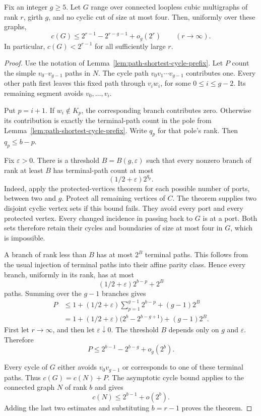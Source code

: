 \begin{theorem}
\label{thm:path-fixed-girth-deficit}
Fix an integer $g\ge5$.
Let $G$ range over connected loopless cubic multigraphs of rank $r$, girth $g$, and no cyclic cut of size at most four.
Then, uniformly over these graphs,
\[
 c(G)\le 2^{r-1}-2^{r-g-1}+o_g(2^r)
 \qquad(r\to\infty).
\]
In particular, $c(G)<2^{r-1}$ for all sufficiently large $r$.
\end{theorem}

\begin{proof}
Use the notation of Lemma~\ref{lem:path-shortest-cycle-prefix}.
Let $P$ count the simple $v_0$--$v_{g-1}$ paths in $N$.
The cycle path $v_0v_1\cdots v_{g-1}$ contributes one.
Every other path first leaves this fixed path through $v_iw_i$, for some $0\le i\le g-2$.
Its remaining segment avoids $v_0,\ldots,v_i$.

Put $p=i+1$.
If $w_i\notin K_p$, the corresponding branch contributes zero.
Otherwise its contribution is exactly the terminal-path count in the pole from Lemma~\ref{lem:path-shortest-cycle-prefix}.
Write $q_p$ for that pole's rank.
Then $q_p\le b-p$.

Fix $\varepsilon>0$.
There is a threshold $B=B(g,\varepsilon)$ such that every nonzero branch of rank at least $B$ has terminal-path count at most
\[
 (1/2+\varepsilon)2^{q_p}.
\]
Indeed, apply the protected-vertices theorem for each possible number of ports, between two and $g$.
Protect all remaining vertices of $C$.
The theorem supplies two disjoint cyclic vertex sets if this bound fails.
They avoid every port and every protected vertex.
Every changed incidence in passing back to $G$ is at a port.
Both sets therefore retain their cycles and boundaries of size at most four in $G$, which is impossible.

A branch of rank less than $B$ has at most $2^B$ terminal paths.
This follows from the usual injection of terminal paths into their affine parity class.
Hence every branch, uniformly in its rank, has at most
\[
 (1/2+\varepsilon)2^{b-p}+2^B
\]
paths.
Summing over the $g-1$ branches gives
\begin{align*}
 P
 &\le 1+(1/2+\varepsilon)\sum_{p=1}^{g-1}2^{b-p}+(g-1)2^B\\
 &=1+(1/2+\varepsilon)\bigl(2^b-2^{b-g+1}\bigr)+(g-1)2^B.
\end{align*}
First let $r\to\infty$, and then let $\varepsilon\downarrow0$.
The threshold $B$ depends only on $g$ and $\varepsilon$.
Therefore
\[
 P\le 2^{b-1}-2^{b-g}+o_g(2^b).
\]

Every cycle of $G$ either avoids $v_0v_{g-1}$ or corresponds to one of these terminal paths.
Thus $c(G)=c(N)+P$.
The asymptotic cycle bound applies to the connected graph $N$ of rank $b$ and gives
\[
 c(N)\le2^{b-1}+o(2^b).
\]
Adding the last two estimates and substituting $b=r-1$ proves the theorem.
\end{proof}

